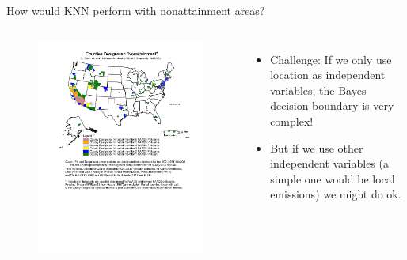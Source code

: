 \documentclass[aspectratio=169]{beamer}
\begin{document}
\begin{frame}{How would KNN perform with nonattainment areas?}

\begin{columns}
\begin{figure}
\includegraphics[width=\textwidth]{EPA_map_nonattain}
\caption*{}
\end{figure}
\pause
\begin{itemize}
\item Challenge: If we only use location as independent variables, the Bayes decision boundary is very complex!
\item But if we use other independent variables (a simple one would be local emissions) we might do ok.
\end{itemize}
\end{columns}
\end{frame}
\end{document}
